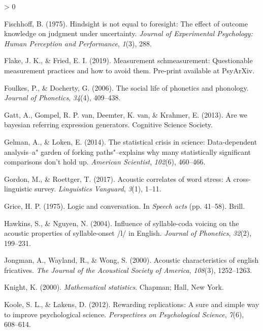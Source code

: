 \documentclass[
  english,
  man,floatsintext]{apa6}
\newlength{\cslhangindent}
\newenvironment{CSLReferences}[2] %
 {%
  \setlength{\parindent}{0pt}
  \ifodd #1 \everypar{\setlength{\hangindent}{\cslhangindent}}\ignorespaces\fi
  \ifnum #2 > 0
  \setlength{\parskip}{#2\baselineskip}
  \fi
 }%
 {}
\begin{document}
\begin{CSLReferences}{1}{0}
\leavevmode\hypertarget{ref-fischhoff1975hindsight}{}%
Fischhoff, B. (1975). Hindsight is not equal to foresight: The effect of outcome knowledge on judgment under uncertainty. \emph{Journal of Experimental Psychology: Human Perception and Performance}, \emph{1}(3), 288.

\leavevmode\hypertarget{ref-flake2019}{}%
Flake, J. K., \& Fried, E. I. (2019). Measurement schmeasurement: Questionable measurement practices and how to avoid them. Pre-print available at PsyArXiv.

\leavevmode\hypertarget{ref-foulkes2006}{}%
Foulkes, P., \& Docherty, G. (2006). The social life of phonetics and phonology. \emph{Journal of Phonetics}, \emph{34}(4), 409--438.

\leavevmode\hypertarget{ref-gatt2013we}{}%
Gatt, A., Gompel, R. P. van, Deemter, K. van, \& Krahmer, E. (2013). Are we bayesian referring expression generators. Cognitive Science Society.

\leavevmode\hypertarget{ref-gelman2014statistical}{}%
Gelman, A., \& Loken, E. (2014). The statistical crisis in science: Data-dependent analysis--a" garden of forking paths"--explains why many statistically significant comparisons don't hold up. \emph{American Scientist}, \emph{102}(6), 460--466.

\leavevmode\hypertarget{ref-gordon2017acoustic}{}%
Gordon, M., \& Roettger, T. (2017). Acoustic correlates of word stress: A cross-linguistic survey. \emph{Linguistics Vanguard}, \emph{3}(1), 1--11.

\leavevmode\hypertarget{ref-grice1975logic}{}%
Grice, H. P. (1975). Logic and conversation. In \emph{Speech acts} (pp. 41--58). Brill.

\leavevmode\hypertarget{ref-hawkins2004influence}{}%
Hawkins, S., \& Nguyen, N. (2004). Influence of syllable-coda voicing on the acoustic properties of syllable-onset /l/ in {E}nglish. \emph{Journal of Phonetics}, \emph{32}(2), 199--231.

\leavevmode\hypertarget{ref-jongman2000acoustic}{}%
Jongman, A., Wayland, R., \& Wong, S. (2000). Acoustic characteristics of english fricatives. \emph{The Journal of the Acoustical Society of America}, \emph{108}(3), 1252--1263.

\leavevmode\hypertarget{ref-knight2000}{}%
Knight, K. (2000). \emph{Mathematical statistics}. Chapman; Hall, New York.

\leavevmode\hypertarget{ref-koole2012rewarding}{}%
Koole, S. L., \& Lakens, D. (2012). Rewarding replications: A sure and simple way to improve psychological science. \emph{Perspectives on Psychological Science}, \emph{7}(6), 608--614.


\end{CSLReferences}
\end{document}
